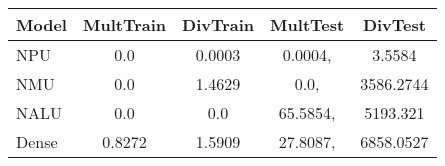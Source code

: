 \begin{tabular}{lcccc}
\toprule
Model & MultTrain & DivTrain & MultTest & DivTest\\
\midrule
NPU & 0.0 & 0.0003 & 0.0004, & 3.5584 \\
NMU & 0.0 & 1.4629 & 0.0, & 3586.2744 \\
NALU & 0.0 & 0.0 & 65.5854, & 5193.321 \\
Dense & 0.8272 & 1.5909 & 27.8087, & 6858.0527 \\
\bottomrule
\end{tabular}
